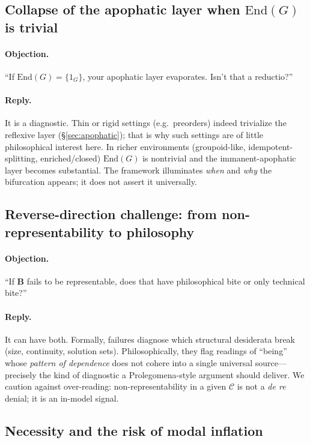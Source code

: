 \documentclass[11pt]{article}
\theoremstyle{upright}
\begin{document}
\subsection{Collapse of the apophatic layer when \texorpdfstring{$\mathrm{End}(G)$}{End(G)} is trivial}
\paragraph{Objection.}
“If \(\mathrm{End}(G)=\{1_G\}\), your apophatic layer evaporates. Isn’t that a reductio?”

\paragraph{Reply.}
It is a diagnostic. Thin or rigid settings (e.g.\ preorders) indeed trivialize the reflexive layer (\S\ref{sec:apophatic}); that is why such settings are of little philosophical interest here. In richer environments (groupoid-like, idempotent-splitting, enriched/closed) \(\mathrm{End}(G)\) is nontrivial and the immanent-apophatic layer becomes substantial. The framework illuminates \emph{when} and \emph{why} the bifurcation appears; it does not assert it universally.

\subsection{Reverse-direction challenge: from non-representability to philosophy}
\paragraph{Objection.}
“If \(\mathbf B\) fails to be representable, does that have philosophical bite or only technical bite?”

\paragraph{Reply.}
It can have both. Formally, failures diagnose which structural desiderata break (size, continuity, solution sets). Philosophically, they flag readings of “being” whose \emph{pattern of dependence} does not cohere into a single universal source—precisely the kind of diagnostic a Prolegomena-style argument should deliver. We caution against over-reading: non-representability in a given \(\mathcal C\) is not a \emph{de re} denial; it is an in-model signal.

\subsection{Necessity and the risk of modal inflation}
\end{document}
